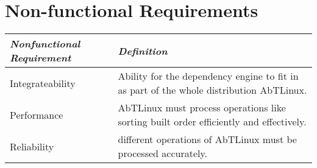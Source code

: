 \section{Non-functional Requirements}
\begin{tabular}[t]{|p{4.5cm}|p{8.5cm}|}
\hline
\em{Nonfunctional Requirement} & \em{Definition} \\ 
\hline
Integrateability & Ability for the dependency engine to fit in as part of the whole distribution AbTLinux.\\
\hline
Performance & AbTLinux must process operations like sorting built order efficiently and effectively.\\
\hline
Reliability & different operations of AbTLinux must be processed accurately.\\
\hline
\end{tabular}